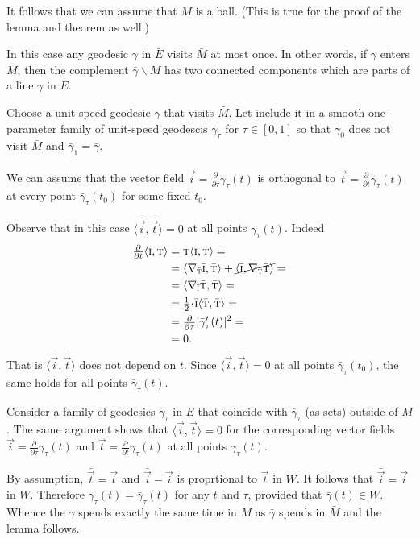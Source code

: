 It follows that we can assume that $M$ is a ball.
(This is true for the proof of the lemma and theorem as well.)

In this case any geodesic $\bar\gamma$ in $\bar E$ visits $\bar M$ at most once.
In other words, if $\bar\gamma$ enters $\bar M$, then the complement $\bar\gamma\backslash \bar M$ has two connected components which are parts of a line $\gamma$ in $E$.

Choose a unit-speed geodesic $\bar\gamma$ that visits $\bar M$.
Let include it in a smooth one-parameter family of unit-speed geodescis $\bar\gamma_\tau$ for $\tau\in [0,1]$ so that $\bar\gamma_0$ does not visit $\bar M$ and $\bar \gamma_1=\bar \gamma$.

We can assume that 
the vector field $\bar{\vec i}
=\tfrac{\partial}{\partial\tau}\bar\gamma_\tau(t)$ is orthogonal to $\bar{\vec t}
=\tfrac{\partial}{\partial t}\bar\gamma_\tau(t)$ at every point $\bar\gamma_\tau(t_0)$ for some fixed $t_0$.

Observe that in this case $\langle\bar{\vec i},\bar{\vec t}\rangle=0$ at all points $\bar\gamma_\tau(t)$.
Indeed 
\begin{align*}
\tfrac{\partial}{\partial t}\langle\bar{\vec i},\bar{\vec t}\rangle&=
\bar{\vec t}\langle\bar{\vec i},\bar{\vec t}\rangle=
\\
&=
\langle\nabla_{\bar{\vec t}}\bar{\vec i},\bar{\vec t}\rangle+\cancel{\langle\bar{\vec i},\nabla_{\bar{\vec t}}\bar{\vec t}\rangle}=
\\
&=\langle\nabla_{\bar{\vec i}}\bar{\vec t},\bar{\vec t}\rangle=
\\
&=\tfrac12\cdot\bar{\vec i}\langle\bar{\vec t},\bar{\vec t}\rangle=
\\
&=\tfrac{\partial}{\partial \tau}|\bar\gamma_\tau'(t)|^2=
\\
&=0.
\end{align*}
That is $\langle\bar{\vec i},\bar{\vec t}\rangle$ does not depend on $t$.
Since $\langle\bar{\vec i},\bar{\vec t}\rangle=0$ at all points $\bar\gamma_\tau(t_0)$, the same holds for all points  $\bar\gamma_\tau(t)$.

Consider a family of geodesics $\gamma_\tau$ in $E$ that coincide with $\bar\gamma_\tau$ (as sets) outside of $M$.
The same argument shows that $\langle\vec i,\vec t\rangle=0$ for the corresponding vector fields ${\vec i}
=\tfrac{\partial}{\partial\tau}\gamma_\tau(t)$ and $\vec t
=\tfrac{\partial}{\partial t}\gamma_\tau(t)$
at all points $\gamma_\tau(t)$.

By assumption, $\bar{\vec t}=\vec t$ and
$\bar{\vec i}-\vec i$ is proprtional to $\vec t$ in $W$.
It follows that $\bar{\vec i}=\vec i$ in $W$.
Therefore $\gamma_\tau(t)=\bar\gamma_\tau(t)$ for any $t$ and $\tau$, provided that $\bar\gamma(t)\in W$.
Whence the $\gamma$ spends exactly the same time in $M$ as 
$\bar \gamma$ spends in $\bar M$ and the lemma follows.\qeds

